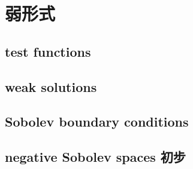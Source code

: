 \section{弱形式}
\label{b2:sec:1501}


\subsection{test functions}
\label{b2:subsec:150101}

\subsection{weak solutions}
\label{b2:subsec:150102}

\subsection{Sobolev boundary conditions}
\label{b2:subsec:150103}

\subsection{negative Sobolev spaces 初步}
\label{b2:subsec:150104}


